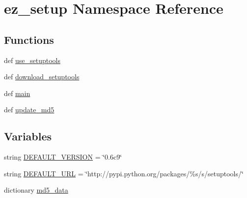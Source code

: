 \hypertarget{namespaceez__setup}{\section{ez\-\_\-setup \-Namespace \-Reference}
\label{namespaceez__setup}
}
\subsection*{\-Functions}
\begin{DoxyCompactItemize}
\item 
def \hyperlink{namespaceez__setup_a66dbd61665af1fc8f89b60d4978bee40}{use\-\_\-setuptools}
\item 
def \hyperlink{namespaceez__setup_a5676d254d60c5d43f5ed67e3141878d2}{download\-\_\-setuptools}
\item 
def \hyperlink{namespaceez__setup_a560f04bfc77f23edc5ff771a484dd3d4}{main}
\item 
def \hyperlink{namespaceez__setup_abf5e2589897175c0720336a5bce96511}{update\-\_\-md5}
\end{DoxyCompactItemize}
\subsection*{\-Variables}
\begin{DoxyCompactItemize}
\item 
string \hyperlink{namespaceez__setup_ab73a46fbe5deb3770b318dc24d185db4}{\-D\-E\-F\-A\-U\-L\-T\-\_\-\-V\-E\-R\-S\-I\-O\-N} = \char`\"{}0.\-6c9\char`\"{}
\item 
string \hyperlink{namespaceez__setup_acb0ebf8437227029f912f8608888d3ab}{\-D\-E\-F\-A\-U\-L\-T\-\_\-\-U\-R\-L} = \char`\"{}http\-://pypi.\-python.\-org/packages/\%s/s/setuptools/\char`\"{}
\item 
dictionary \hyperlink{namespaceez__setup_ad479fbda506c99dd951a86881ef69d07}{md5\-\_\-data}
\end{DoxyCompactItemize}


